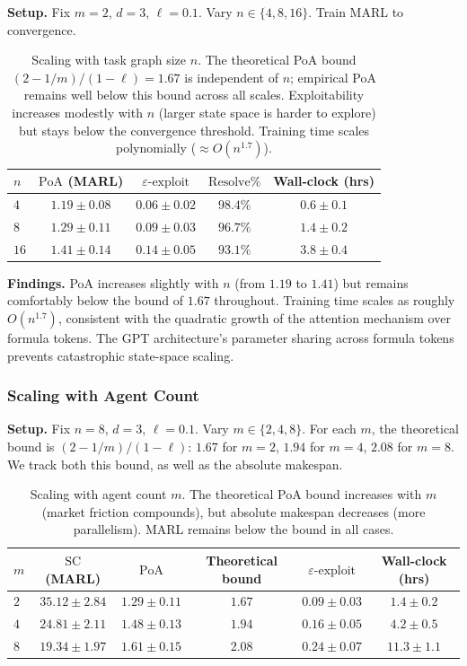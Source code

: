 \textbf{Setup.} Fix $m=2$, $d=3$, $\ell=0.1$. Vary $n\in\{4, 8, 16\}$. Train MARL to convergence.
 
\begin{table}[ht]
\centering
\caption{Scaling with task graph size $n$. The theoretical PoA bound $(2-1/m)/(1-\ell) = 1.67$ is independent of $n$; empirical PoA remains well below this bound across all scales. Exploitability increases modestly with $n$ (larger state space is harder to explore) but stays below the convergence threshold. Training time scales polynomially ($\approx O(n^{1.7})$).}
\label{tab:e5-tasks}
\begin{tabular}{l|cccc}
\toprule
$n$ & $\mathrm{PoA}$ (MARL) & $\varepsilon\text{-exploit}$ & $\mathrm{Resolve\%}$ & Wall-clock (hrs) \\
\midrule
$4$  & $1.19 \pm 0.08$ & $0.06 \pm 0.02$ & $98.4\%$ & $0.6 \pm 0.1$ \\
$8$  & $1.29 \pm 0.11$ & $0.09 \pm 0.03$ & $96.7\%$ & $1.4 \pm 0.2$ \\
$16$ & $1.41 \pm 0.14$ & $0.14 \pm 0.05$ & $93.1\%$ & $3.8 \pm 0.4$ \\
\bottomrule
\end{tabular}
\end{table}
 
\textbf{Findings.} PoA increases slightly with $n$ (from $1.19$ to $1.41$) but remains comfortably below the bound of $1.67$ throughout. Training time scales as roughly $O(n^{1.7})$, consistent with the quadratic growth of the attention mechanism over formula tokens. The GPT architecture's parameter sharing across formula tokens prevents catastrophic state-space scaling.
 
\subsubsection{Scaling with Agent Count}
 
\textbf{Setup.} Fix $n=8$, $d=3$, $\ell=0.1$. Vary $m\in\{2, 4, 8\}$. For each $m$, the theoretical bound is $(2-1/m)/(1-\ell)$: $1.67$ for $m=2$, $1.94$ for $m=4$, $2.08$ for $m=8$. We track both this bound, as well as the absolute makespan.
 
\begin{table}
\centering
\caption{Scaling with agent count $m$. The theoretical PoA bound increases with $m$ (market friction compounds), but absolute makespan decreases (more parallelism). MARL remains below the bound in all cases.}
\label{tab:e5-agents}
\begin{tabular}{l|ccccc}
\toprule
$m$ & $\mathrm{SC}$ (MARL) & $\mathrm{PoA}$ & Theoretical bound & $\varepsilon\text{-exploit}$ & Wall-clock (hrs) \\
\midrule
$2$ & $35.12 \pm 2.84$ & $1.29 \pm 0.11$ & $1.67$ & $0.09 \pm 0.03$ & $1.4 \pm 0.2$ \\
$4$ & $24.81 \pm 2.11$ & $1.48 \pm 0.13$ & $1.94$ & $0.16 \pm 0.05$ & $4.2 \pm 0.5$ \\
$8$ & $19.34 \pm 1.97$ & $1.61 \pm 0.15$ & $2.08$ & $0.24 \pm 0.07$ & $11.3 \pm 1.1$ \\
\bottomrule
\end{tabular}
\end{table}
 

